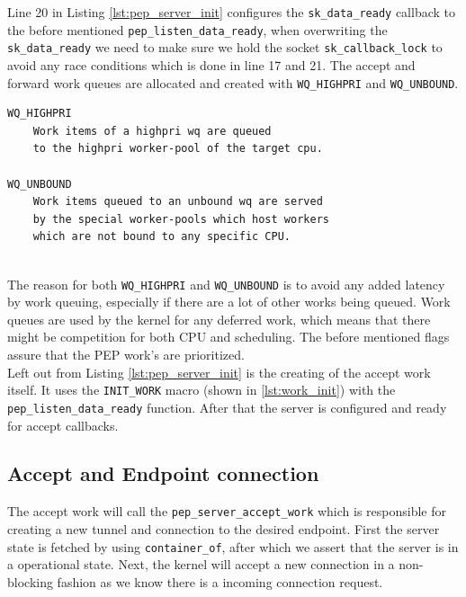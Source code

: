 \documentclass[a4paper,english, 11pt]{report}
\begin{document}
Line 20 in Listing \ref{lst:pep_server_init} configures the \verb|sk_data_ready| callback to the before mentioned \verb|pep_listen_data_ready|, when overwriting the \verb|sk_data_ready| we need to make sure we hold the socket \verb|sk_callback_lock| to avoid any race conditions which is done in line 17 and 21. The accept and forward work queues are allocated and created with \verb|WQ_HIGHPRI| and \verb|WQ_UNBOUND|.\\

\noindent\begin{minipage}{\linewidth}
\begin{verbatim}
WQ_HIGHPRI
    Work items of a highpri wq are queued
    to the highpri worker-pool of the target cpu.

WQ_UNBOUND
    Work items queued to an unbound wq are served
    by the special worker-pools which host workers
    which are not bound to any specific CPU.
\end{verbatim}
\end{minipage}\\

The reason for both \verb|WQ_HIGHPRI| and \verb|WQ_UNBOUND| is to avoid any added latency by work queuing, especially if there are a lot of other works being queued. Work queues are used by the kernel for any deferred work, which means that there might be competition for both CPU and scheduling. The before mentioned flags assure that the PEP work's are prioritized.\\

Left out from Listing \ref{lst:pep_server_init} is the creating of the accept work itself. It uses the \verb|INIT_WORK| macro (shown in \ref{lst:work_init}) with the \verb|pep_listen_data_ready| function. After that the server is configured and ready for accept callbacks.

\subsection{Accept and Endpoint connection}
The accept work will call the \verb|pep_server_accept_work| which is responsible for creating a new tunnel and connection to the desired endpoint. First the server state is fetched by using \verb|container_of|, after which we assert that the server is in a operational state. Next, the kernel will accept a new connection in a non-blocking fashion as we know there is a incoming connection request.\\
\end{document}
